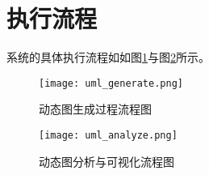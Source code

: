 \section{执行流程}





系统的具体执行流程如如图\ref{fig:uml_generate}与图\ref{fig:uml_analyze}所示。

\begin{figure}[H]
  \centering
  \texttt{[image: uml\_generate.png]}
  \caption{动态图生成过程流程图}
  \label{fig:uml_generate}
\end{figure}

\begin{figure}[H]
  \centering
  \texttt{[image: uml\_analyze.png]}
  \caption{动态图分析与可视化流程图}
  \label{fig:uml_analyze}
\end{figure}